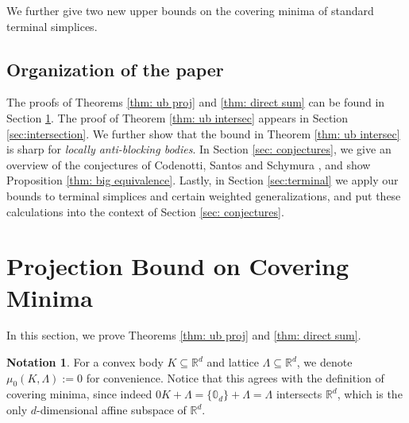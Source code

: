 \documentclass{amsart}
\theoremstyle{definition}
\newtheorem{notation}[theorem]{Notation}
\theoremstyle{remark}
\newcommand{\R}{\mathbb{R}}
\begin{document}
\noindent We further give two new upper bounds on the covering minima of standard terminal simplices.
\subsection{Organization of the paper}

The proofs of Theorems \ref{thm: ub proj} and \ref{thm: direct sum} can be found in Section \ref{sec:projection}.
%
The proof of Theorem \ref{thm: ub intersec} appears in Section \ref{sec:intersection}. We further show that the bound in Theorem \ref{thm: ub intersec} is sharp for \textit{locally anti-blocking bodies}.
%
In Section \ref{sec: conjectures}, we give an overview of the conjectures of Codenotti, Santos and Schymura \cite{CodenottiSantosSchymura}, and show Proposition \ref{thm: big equivalence}.
%
Lastly, in Section \ref{sec:terminal} we apply our bounds to terminal simplices and certain weighted generalizations, and put these calculations into the context of Section \ref{sec: conjectures}.




\section{Projection Bound on Covering Minima}\label{sec:projection}
In this section, we prove Theorems \ref{thm: ub proj} and \ref{thm: direct sum}.

\begin{notation}
For a convex body $K\subseteq \R^d$ and lattice $\Lambda\subseteq \R^d$, we denote $\mu_0(K,\Lambda):=0$ for convenience. Notice that this agrees with the definition of covering minima, since indeed $0K+\Lambda=\{\mathbb{0}_d\}+\Lambda=\Lambda$ intersects $\R^d$, which is the only $d$-dimensional affine subspace of $\R^d$.
\end{notation}
\end{document}
